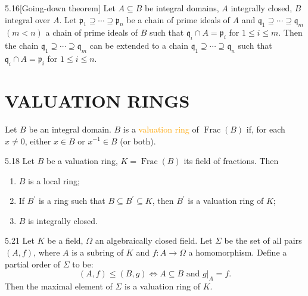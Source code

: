 \begin{theorem}{5.16}[Going-down theorem]
	Let $A\subseteq B$ be integral domains, $A$ integrally closed, $B$ integral over $A$. Let $\mathfrak{p}_1\supseteq\cdots\supseteq\mathfrak{p}_n$ be a chain of prime ideals of $A$ and $\mathfrak{q}_1\supseteq\cdots\supseteq\mathfrak{q}_m$ $(m<n)$ a chain of prime ideals of $B$ such that $\mathfrak{q}_i\cap A=\mathfrak{p}_i$ for $1\leqslant i\leqslant m$. Then the chain $\mathfrak{q}_1\supseteq\cdots\supseteq\mathfrak{q}_m$ can be extended to a chain $\mathfrak{q}_1\supseteq\cdots\supseteq\mathfrak{q}_n$ such that $\mathfrak{q}_i\cap A=\mathfrak{p}_i$ for $1\leqslant i\leqslant n$.
\end{theorem}

\section*{VALUATION RINGS}

\begin{definition}
	Let $B$ be an integral domain. $B$ is a \textcolor{orange}{valuation ring} of $\operatorname{Frac}(B)$ if, for each $x\neq0$, either $x\in B$ or $x^{-1}\in B$ (or both).
\end{definition}

\begin{proposition}{5.18}
	Let $B$ be a valuation ring, $K=\operatorname{Frac}(B)$ its field of fractions. Then
	\begin{enumerate}[label=\textup{(\roman*)},ref=\thepropositiontemp(\roman*)]
		\item\label{5.18.1} $B$ is a local ring;
		\item\label{5.18.2} If $B^\prime$ is a ring such that $B\subseteq B^\prime\subseteq K$, then $B^\prime$ is a valuation ring of $K$;
		\item\label{5.18.3} $B$ is integrally closed.
	\end{enumerate}
\end{proposition}

\begin{theorem}{5.21}
	Let $K$ be a field, $\Omega$ an algebraically closed field. Let $\Sigma$ be the set of all pairs $(A,f)$, where $A$ is a subring of $K$ and $f:A\rightarrow\Omega$ a homomorphism. Define a partial order of $\Sigma$ to be:
	\begin{equation*}
		(A,f)\leqslant(B,g)\Leftrightarrow A\subseteq B \text{ and } g|_A=f.
	\end{equation*}
	Then the maximal element of $\Sigma$ is a valuation ring of $K$.
\end{theorem}

